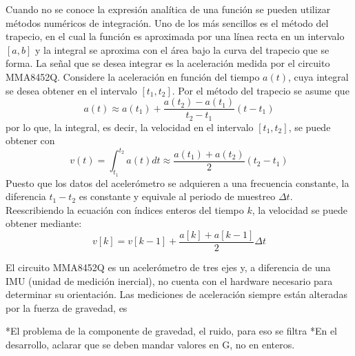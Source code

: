 \documentclass[letterpaper,12pt]{article}
\begin{document}
Cuando no se conoce la expresión analítica de una función se pueden utilizar métodos numéricos de integración. Uno de los más sencillos es el método del trapecio, en el cual la función es aproximada por una línea recta en un intervalo $[a,b]$ y la integral se aproxima con el área bajo la curva del trapecio que se forma. La señal que se desea integrar es la aceleración medida por el circuito MMA8452Q. Considere la aceleración en función del tiempo $a(t)$, cuya integral se desea obtener en el intervalo $[t_1,t_2]$. Por el método del trapecio se asume que
\[a(t) \approx  a(t_1) + \frac{a(t_2) - a(t_1)}{t_2 - t_1}(t - t_1)\]
por lo que, la integral, es decir, la velocidad en el intervalo $[t_1,t_2]$, se puede obtener con
\[v(t) = \int_{t_1}^{t_2} a(t)dt \approx \frac{a(t_1) + a(t_2)}{2}(t_2 - t_1)\]
Puesto que los datos del acelerómetro se adquieren a una frecuencia constante, la diferencia $t_1 - t_2$ es constante y equivale al periodo de muestreo $\Delta t$. Reescribiendo la ecuación con índices enteros del tiempo $k$, la velocidad se puede obtener mediante:
\begin{equation}
v[k] = v[k-1] + \frac{a[k] + a[k-1]}{2}\Delta t
\end{equation}

El circuito MMA8452Q es un acelerómetro de tres ejes y, a diferencia de una IMU (unidad de medición inercial), no cuenta con el hardware necesario para determinar su orientación. Las mediciones de aceleración siempre están alteradas por la fuerza de gravedad, es 

*El problema de la componente de gravedad, el ruido, para eso se filtra
*En el desarrollo, aclarar que se deben mandar valores en G, no en enteros.
\end{document}
